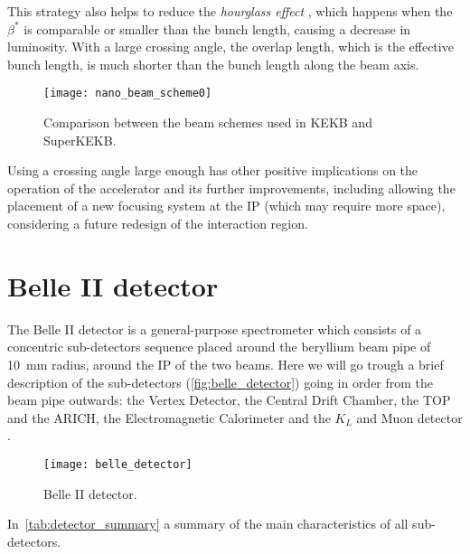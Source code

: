 This strategy also helps to reduce the \textit{hourglass effect} \cite{Ohnishi:2013fma}, which happens when the $\beta^{*}$ is comparable or smaller than the bunch length, causing a decrease in luminosity. With a large crossing angle, the overlap length, which is the effective bunch length, is much shorter than the bunch length along the beam axis. \\


\begin{figure}[h!]
\centering
\texttt{[image: nano\_beam\_scheme0]}
\caption{Comparison between the beam schemes used in KEKB and SuperKEKB.}
\label{fig:beam_scheme_comparison}
\end{figure}

Using a crossing angle large enough has other positive implications on the operation of the accelerator and its further improvements, including allowing the placement of a new focusing system at the IP (which may require more space), considering a future redesign of the interaction region.


\section{Belle II detector}


The Belle II detector is a general-purpose spectrometer which consists of a concentric sub-detectors sequence placed around the beryllium beam pipe of \SI{10}{mm} radius, around the IP of the two beams. Here we will go trough a brief description of the sub-detectors (\autoref{fig:belle_detector}) going in order from the beam pipe outwards: the Vertex Detector, the Central Drift Chamber, the TOP and the ARICH, the Electromagnetic Calorimeter and the $K_{L}$ and Muon detector \cite{physics_book, Belle-II:2010dht, Adachi:2018qme}.\\

\begin{figure}[h!]
\centering
\texttt{[image: belle\_detector]}
\caption{Belle II detector.}
\label{fig:belle_detector}
\end{figure}

In~\autoref{tab:detector_summary} a summary of the main characteristics of all sub-detectors.

